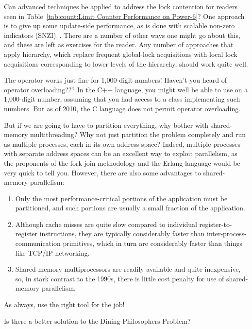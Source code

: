 \begin{enumerate}
\QuickQ{}
	Can advanced techniques be applied to address the lock
	contention for readers seen in
	Table~\ref{tab:count:Limit Counter Performance on Power-6}?
\QuickA{}
	One approach is to give up some update-side performance, as is
	done with scalable non-zero indicators
	(SNZI)~\cite{FaithEllen:2007:SNZI}.
	There are a number of other ways one might go about this, and these
	are left as exercises for the reader.
	Any number of approaches that apply hierarchy, which replace
	frequent global-lock acquisitions with local lock acquisitions
	corresponding to lower levels of the hierarchy, should work quite well.

\QuickQ{}
	The \co{++} operator works just fine for 1,000-digit numbers!
	Haven't you heard of operator overloading???
\QuickA{}
	In the C++ language, you might well be able to use \co{++}
	on a 1,000-digit number, assuming that you had access to a
	class implementing such numbers.
	But as of 2010, the C language does not permit operator overloading.

\QuickQ{}
	But if we are going to have to partition everything, why bother
	with shared-memory multithreading?
	Why not just partition the problem completely and run as
	multiple processes, each in its own address space?
\QuickA{}
	Indeed, multiple processes with separate address spaces can be
	an excellent way to exploit parallelism, as the proponents of
	the fork-join methodology and the Erlang language would be very
	quick to tell you.
	However, there are also some advantages to shared-memory parallelism:
	\begin{enumerate}
	\item	Only the most performance-critical portions of the
		application must be partitioned, and such portions
		are usually a small fraction of the application.
	\item	Although cache misses are quite slow compared to
		individual register-to-register instructions,
		they are typically considerably faster than
		inter-process-communication primitives, which in
		turn are considerably faster than things like
		TCP/IP networking.
	\item	Shared-memory multiprocessors are readily available
		and quite inexpensive, so, in stark contrast to the
		1990s, there is little cost penalty for use of
		shared-memory parallelism.
	\end{enumerate}
	As always, use the right tool for the job!

\QuickQ{}
	Is there a better solution to the Dining
	Philosophers Problem?
\QuickA{}


\end{enumerate}
